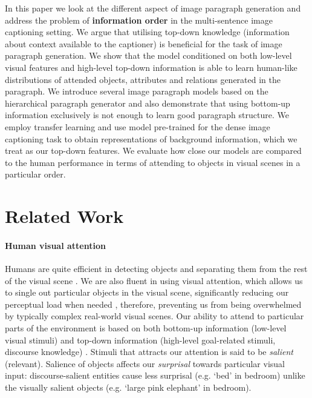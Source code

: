 \documentclass[11pt,a4paper]{article}
\begin{document}
In this paper we look at the different aspect of image paragraph generation and address the problem of \textbf{information order} in the multi-sentence image captioning setting.
We argue that utilising top-down knowledge (information about context available to the captioner) is beneficial for the task of image paragraph generation.
We show that the model conditioned on both low-level visual features and high-level top-down information is able to learn human-like distributions of attended objects, attributes and relations generated in the paragraph.
We introduce several image paragraph models based on the hierarchical paragraph generator  and also
demonstrate that using bottom-up information exclusively is not enough to learn good paragraph structure.
We employ transfer learning and use model pre-trained for the dense image captioning task \cite{densecap} to obtain representations of background information, which we treat as our top-down features.
We evaluate how close our models are compared to the human performance in terms of attending to objects in visual scenes in a particular order.

\fi


\section{Related Work}

\iffalse
\paragraph{Human visual attention}
Humans are quite efficient in detecting objects and separating them from the rest of the visual scene \cite{Ullman87}.
We are also fluent in using visual attention, which allows us to single out particular objects in the visual scene, significantly reducing our perceptual load when needed \cite{Lavie04}, therefore, preventing us from being overwhelmed by typically complex real-world visual scenes.
Our ability to attend to particular parts of the environment is based on both bottom-up information (low-level visual stimuli) and top-down information (high-level goal-related stimuli, discourse knowledge) \cite{Zarcone2016}. %
Stimuli that attracts our attention is said to be \textit{salient} (relevant). Salience of objects affects our \textit{surprisal} towards particular visual input: discourse-salient entities cause less surprisal (e.g. `bed' in bedroom) unlike the visually salient objects (e.g. `large pink elephant' in bedroom).
\end{document}
